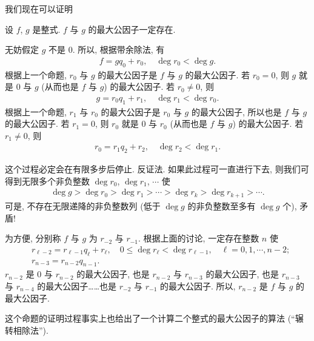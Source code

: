 我们现在可以证明
\begin{proposition}
    设 $f$, $g$ 是整式. $f$ 与 $g$ 的最大公因子一定存在.
\end{proposition}

\begin{pf}
    无妨假定 $g$ 不是 $0$. 所以, 根据带余除法, 有
    \begin{align*}
        f = gq_0 + r_0, \quad \deg r_0 < \deg g.
    \end{align*}
    根据上一个命题, $r_0$ 与 $g$ 的最大公因子是 $f$ 与 $g$ 的最大公因子. 若 $r_0 = 0$, 则 $g$ 就是 $0$ 与 $g$ (从而也是 $f$ 与 $g$) 的最大公因子. 若 $r_0 \neq 0$, 则
    \begin{align*}
        g = r_0 q_1 + r_1, \quad \deg r_1 < \deg r_0.
    \end{align*}
    根据上一个命题, $r_1$ 与 $r_0$ 的最大公因子是 $r_0$ 与 $g$ 的最大公因子, 所以也是 $f$ 与 $g$ 的最大公因子. 若 $r_1 = 0$, 则 $r_0$ 就是 $0$ 与 $r_0$ (从而也是 $f$ 与 $g$) 的最大公因子. 若 $r_1 \neq 0$, 则
    \begin{align*}
        r_0 = r_1 q_2 + r_2, \quad \deg r_2 < \deg r_1.
    \end{align*}

    这个过程必定会在有限多步后停止. 反证法. 如果此过程可一直进行下去, 则我们可得到无限多个非负整数 $\deg r_0$, $\deg r_1$, $\cdots$ 使
    \begin{align*}
        \deg g > \deg r_0 > \deg r_1 > \cdots > \deg r_k > \deg r_{k+1} > \cdots.
    \end{align*}
    可是, 不存在无限递降的非负整数列 (低于 $\deg g$ 的非负整数至多有 $\deg g$ 个), 矛盾!

    为方便, 分别称 $f$ 与 $g$ 为 $r_{-2}$ 与 $r_{-1}$. 根据上面的讨论, 一定存在整数 $n$ 使
    \begin{align*}
         & r_{\ell - 2} = r_{\ell - 1} q_{\ell} + r_{\ell}, \quad 0 \leq \deg r_{\ell} < \deg r_{\ell - 1}, \quad \ell = 0,1,\cdots,n-2; \\
         & r_{n - 3} = r_{n - 2} q_{n - 1}.
    \end{align*}
    $r_{n-2}$ 是 $0$ 与 $r_{n-2}$ 的最大公因子, 也是 $r_{n-2}$ 与 $r_{n-3}$ 的最大公因子, 也是 $r_{n-3}$ 与 $r_{n-4}$ 的最大公因子……也是 $r_{-2}$ 与 $r_{-1}$ 的最大公因子. 所以, $r_{n-2}$ 是 $f$ 与 $g$ 的最大公因子.
\end{pf}

这个命题的证明过程事实上也给出了一个计算二个整式的最大公因子的算法 (``辗转相除法'').

